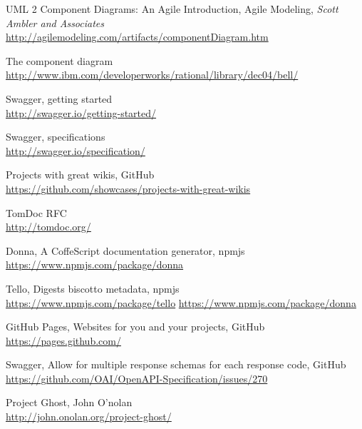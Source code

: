  UML 2 Component Diagrams: An Agile Introduction,
    \newblock Agile Modeling, \emph{Scott Ambler and Associates}\\
    \newblock \url{http://agilemodeling.com/artifacts/componentDiagram.htm}

 The component diagram\\
    \newblock \url{http://www.ibm.com/developerworks/rational/library/dec04/bell/}

 Swagger, getting started\\
    \newblock \url{http://swagger.io/getting-started/}

 Swagger, specifications\\
    \newblock \url{http://swagger.io/specification/}

 Projects with great wikis,
    \newblock GitHub\\
    \newblock \url{https://github.com/showcases/projects-with-great-wikis}

 TomDoc RFC\\
    \newblock \url{http://tomdoc.org/}

 Donna, A CoffeScript documentation generator,
    \newblock npmjs\\
    \newblock \url{https://www.npmjs.com/package/donna}

 Tello, Digests biscotto metadata,
    \newblock npmjs\\
    \newblock \url{https://www.npmjs.com/package/tello}
    \newblock \url{https://www.npmjs.com/package/donna}

 GitHub Pages, Websites for you and your projects,
    \newblock GitHub\\
    \newblock \url{https://pages.github.com/}

 Swagger, Allow for multiple response schemas for each response code,
    \newblock GitHub\\
    \newblock \url{https://github.com/OAI/OpenAPI-Specification/issues/270}

 Project Ghost,
    \newblock John O'nolan\\
    \newblock \url{http://john.onolan.org/project-ghost/}